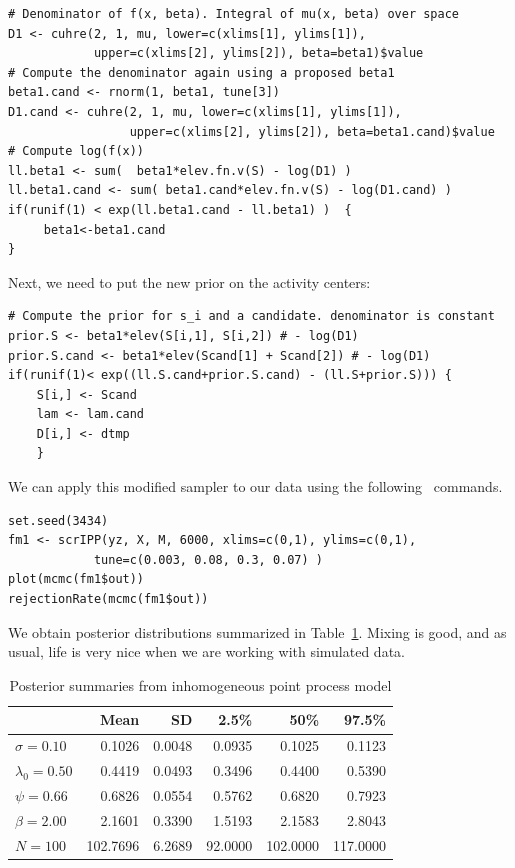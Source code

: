\begin{small}
\begin{verbatim}
# Denominator of f(x, beta). Integral of mu(x, beta) over space
D1 <- cuhre(2, 1, mu, lower=c(xlims[1], ylims[1]),
            upper=c(xlims[2], ylims[2]), beta=beta1)$value
# Compute the denominator again using a proposed beta1
beta1.cand <- rnorm(1, beta1, tune[3])
D1.cand <- cuhre(2, 1, mu, lower=c(xlims[1], ylims[1]),
                 upper=c(xlims[2], ylims[2]), beta=beta1.cand)$value
# Compute log(f(x))
ll.beta1 <- sum(  beta1*elev.fn.v(S) - log(D1) )
ll.beta1.cand <- sum( beta1.cand*elev.fn.v(S) - log(D1.cand) )
if(runif(1) < exp(ll.beta1.cand - ll.beta1) )  {
     beta1<-beta1.cand
}
\end{verbatim}
\end{small}
Next, we need to put the new prior on the activity centers:

\begin{small}
\begin{verbatim}
# Compute the prior for s_i and a candidate. denominator is constant
prior.S <- beta1*elev(S[i,1], S[i,2]) # - log(D1)
prior.S.cand <- beta1*elev(Scand[1] + Scand[2]) # - log(D1)
if(runif(1)< exp((ll.S.cand+prior.S.cand) - (ll.S+prior.S))) {
    S[i,] <- Scand
    lam <- lam.cand
    D[i,] <- dtmp
    }
\end{verbatim}
\end{small}

We can apply this modified sampler to our data using the
following \R~commands.
\begin{small}
\begin{verbatim}
set.seed(3434)
fm1 <- scrIPP(yz, X, M, 6000, xlims=c(0,1), ylims=c(0,1),
            tune=c(0.003, 0.08, 0.3, 0.07) )
plot(mcmc(fm1$out))
rejectionRate(mcmc(fm1$out))
\end{verbatim}
\end{small}

We obtain posterior
distributions summarized in Table~\ref{ch9.tab.simIPP}. Mixing is good, and as usual,
life is very nice when we are working with simulated data.

\begin{table}[b]
\centering
\caption{Posterior summaries from inhomogeneous point process model}
\begin{tabular}{lrrrrr}
\hline
& Mean & SD & 2.5\% & 50\% & 97.5\% \\
\hline
 $\sigma =0.10$ &   0.1026 &   0.0048 &   0.0935 &   0.1025 &   0.1123 \\
 $\lambda_0=0.50$ &   0.4419 &   0.0493 &   0.3496 &   0.4400 &   0.5390 \\
 $\psi =0.66$ &   0.6826 &   0.0554 &   0.5762 &   0.6820 &   0.7923 \\
 $\beta =2.00$ &   2.1601 &   0.3390 &   1.5193 &   2.1583 &   2.8043 \\
 $N =100$ & 102.7696 &   6.2689 &  92.0000 & 102.0000 & 117.0000 \\
\hline
\end{tabular}
\label{ch9.tab.simIPP}
\end{table}


